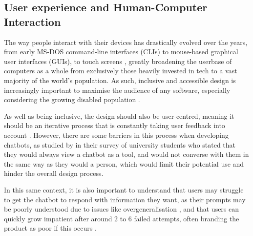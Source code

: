 \documentclass[12pt]{report}
\begin{document}
    \subsection{User experience and Human-Computer Interaction}

    The way people interact with their devices has drastically evolved over the years, from early MS-DOS command-line 
    interfaces (CLIs) to mouse-based graphical user interfaces (GUIs), to touch screens \autocite{kotian_systematic_2024}, greatly broadening
    the userbase of computers as a whole from exclusively those heavily invested in tech to a vast majority of the world's 
    population. As such, inclusive and accessible design is increasingly important to maximise the audience of any software,
    especially considering the growing disabled population \autocite{putnam_how_2012}. 
    
    As well as being inclusive, the design 
    should also be user-centred, meaning it should be an iterative process that is constantly taking user feedback 
    into account \autocite{chammas_closer_2015}. However, there are some barriers in this process when developing 
    chatbots, as studied by \textcite{clark_what_2019} in their survey of university students who stated that they would 
    always view a chatbot as a tool, and would not converse with them in the same way as they would a person, which would 
    limit their potential use and hinder the overall design process. 


    In this same context, it is also important to understand that users may struggle
    to get the chatbot to respond with information they want, as their prompts may be poorly understood
    due to issues like overgeneralisation \autocite{zamfirescu-pereira_why_2023}, and that users can quickly 
    grow impatient after around 2 to 6 failed attempts, often branding the product as poor if this occurs \autocite{luger_like_2016}.


    
    
\end{document}
